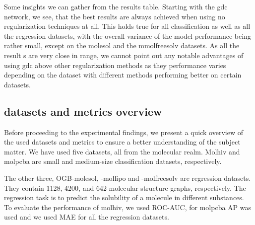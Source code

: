 Some insights we can gather from the results table.
Starting with the \ac{gdc} network, we see, that the best results are always achieved when using no regularization techniques at all. This holds true for all classification as well as all the regression datasets, with the overall variance of the model performance being rather small, except on the molesol and the mmolfreesolv datasets. As all the result s are very close in range, we cannot point out any notable advantages of using \ac{gdc} above other regularization methods as they performance varies depending on the dataset with different methods performing better on certain datasets.






\subsection{datasets and metrics overview}

Before proceeding to the experimental findings, we present a quick overview of the used datasets and metrics to ensure a better understanding of the subject matter. We have used five datasets, all from the molecular realm. Molhiv and molpcba are small and medium-size classification datasets, respectively.

The other three, OGB-molesol, -mollipo and -molfreesolv are regression datasets. They contain 1128, 4200, and 642
molecular structure graphs, respectively. The regression task is to predict the solubility
of a molecule in different substances.
To evaluate the performance of molhiv, we used ROC-AUC, for molpcba AP was used and we used MAE for all the regression datasets.


